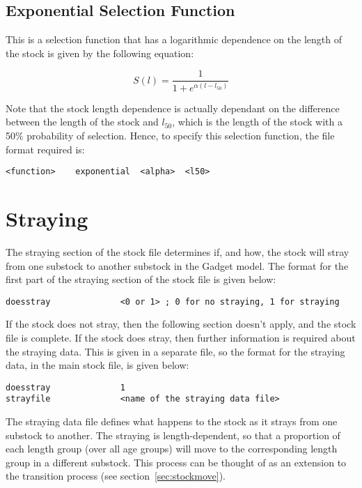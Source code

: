 \documentclass[10pt,twoside]{book}
\begin{document}
\subsection{Exponential Selection Function}
This is a selection function that has a logarithmic dependence on the length of the stock is given by the following equation:

\begin{equation}\label{eq:expsel}
S(l) = \frac{1}{1 + e^{ \alpha (l - l_{50})}}
\end{equation}

\bigskip
Note that the stock length dependence is actually dependant on the difference between the length of the stock and $l_{50}$, which is the length of the stock with a 50\% probability of selection.  Hence, to specify this selection function, the file format required is:

{\small\begin{verbatim}
<function>    exponential  <alpha>  <l50>
\end{verbatim}}

\section{Straying}\label{sec:stockstray}
The straying section of the stock file determines if, and how, the stock will stray from one substock to another substock in the Gadget model.  The format for the first part of the straying section of the stock file is given below:

{\small\begin{verbatim}
doesstray              <0 or 1> ; 0 for no straying, 1 for straying
\end{verbatim}}

If the stock does not stray, then the following section doesn't apply, and the stock file is complete.  If the stock does stray, then further information is required about the straying data.  This is given in a separate file, so the format for the straying data, in the main stock file, is given below:

{\small\begin{verbatim}
doesstray              1
strayfile              <name of the straying data file>
\end{verbatim}}

The straying data file defines what happens to the stock as it strays from one substock to another.  The straying is length-dependent, so that a proportion of each length group (over all age groups) will move to the corresponding length group in a different substock.  This process can be thought of as an extension to the transition process (see section~\ref{sec:stockmove}).
\end{document}
